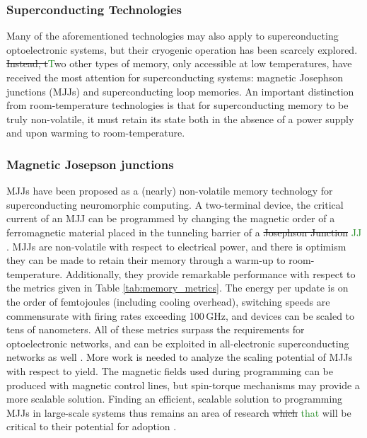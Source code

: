 \documentclass[twocolumn]{article}
\begin{document}
\subsubsection{Superconducting Technologies}
Many of the aforementioned technologies may also apply to superconducting optoelectronic systems, but their cryogenic operation has been scarcely explored. \sout{Instead, t}\textcolor{ForestGreen}{T}wo other types of memory, only accessible at low temperatures, have received the most attention for superconducting systems: magnetic Josephson junctions (MJJs) and superconducting loop memories. An important distinction from room-temperature technologies is that for superconducting memory to be truly non-volatile, it must retain its state both in the absence of a power supply and upon warming to room-temperature.

\subsubsection{Magnetic Josepson junctions}
MJJs have been proposed as a (nearly) non-volatile memory technology for superconducting neuromorphic computing. A two-terminal device, the critical current of an MJJ can be programmed by changing the magnetic order of a ferromagnetic material placed in the tunneling barrier of a \sout{Josephson Junction} \textcolor{ForestGreen}{JJ} \cite{schneider2018ultralow}. MJJs are non-volatile with respect to electrical power, and there is optimism they can be made to retain their memory through a warm-up to room-temperature. Additionally, they provide remarkable performance with respect to the metrics given in Table \ref{tab:memory_metrics}. The energy per update is on the order of femtojoules (including cooling overhead), switching speeds are commensurate with firing rates exceeding 100\,GHz, and devices can be scaled to tens of nanometers. All of these metrics surpass the requirements for optoelectronic networks, and can be exploited in all-electronic superconducting networks as well \cite{schneider2018tutorial}. More work is needed to analyze the scaling potential of MJJs with respect to yield. The magnetic fields used during programming can be produced with magnetic control lines, but spin-torque mechanisms may provide a more scalable solution. Finding an efficient, scalable solution to programming MJJs in large-scale systems thus remains an area of research \sout{which} \textcolor{ForestGreen}{that} will be critical to their potential for adoption \sout{\cite{schneider2018ultralow}}.
\end{document}
